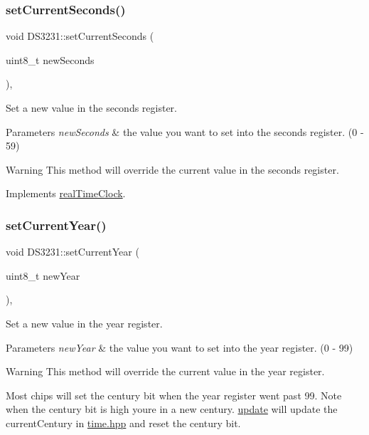 \subsubsection{\texorpdfstring{set\+Current\+Seconds()}{setCurrentSeconds()}}
{\footnotesize\ttfamily void D\+S3231\+::set\+Current\+Seconds (\begin{DoxyParamCaption}\item[{uint8\+\_\+t}]{new\+Seconds }\end{DoxyParamCaption})\hspace{0.3cm}{\ttfamily [override]}, {\ttfamily [virtual]}}



Set a new value in the seconds register. 


\begin{DoxyParams}{Parameters}
{\em new\+Seconds} & the value you want to set into the seconds register. (0 -\/ 59) \\
\hline
\end{DoxyParams}
\begin{DoxyWarning}{Warning}
This method will override the current value in the seconds register. 
\end{DoxyWarning}


Implements \mbox{\hyperlink{classreal_time_clock_a463a64d4861c75e26a80712e1dd50e6b}{real\+Time\+Clock}}.

\mbox{\label{class_d_s3231_a59a60a725581bc8e5dcf857ea52c6281}} 
\subsubsection{\texorpdfstring{set\+Current\+Year()}{setCurrentYear()}}
{\footnotesize\ttfamily void D\+S3231\+::set\+Current\+Year (\begin{DoxyParamCaption}\item[{uint8\+\_\+t}]{new\+Year }\end{DoxyParamCaption})\hspace{0.3cm}{\ttfamily [override]}, {\ttfamily [virtual]}}



Set a new value in the year register. 


\begin{DoxyParams}{Parameters}
{\em new\+Year} & the value you want to set into the year register. (0 -\/ 99) \\
\hline
\end{DoxyParams}
\begin{DoxyWarning}{Warning}
This method will override the current value in the year register. 

Most chips will set the century bit when the year register went past 99. Note when the century bit is high you\textquotesingle{}re in a new century. \mbox{\hyperlink{class_d_s3231_a143ec57122d892ea0ec671a153352f2c}{update}} will update the current\+Century in \mbox{\hyperlink{time_8hpp_source}{time.\+hpp}} and reset the century bit. 
\end{DoxyWarning}


